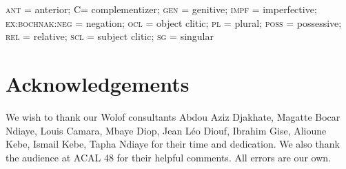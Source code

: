 \documentclass[output=paper]{langsci/langsci}
\begin{document}
\textsc{ant} = anterior; C= complementizer; \textsc{gen} = genitive; \textsc{impf} = imperfective; \textsc{ex:bochnak:neg} =
negation; \textsc{ocl} = object clitic; \textsc{pl} = plural; \textsc{poss} = possessive;
\textsc{rel} = relative; \textsc{scl} = subject clitic; \textsc{sg} = singular


\section*{Acknowledgements}

We wish to thank our Wolof consultants Abdou Aziz Djakhate, Magatte Bocar Ndiaye, Louis Camara, Mbaye
Diop, Jean L\'eo Diouf, Ibrahim Gise,  Alioune Kebe, Ismail Kebe,
Tapha Ndiaye for their time and dedication. We also thank the audience
at ACAL 48 for their helpful comments. All errors are our own.  

\printbibliography[heading=subbibliography,notkeyword=this]
\end{document}
